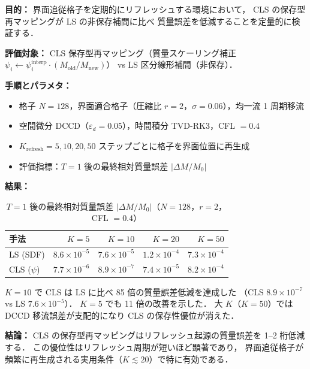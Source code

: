 %

\noindent\textbf{目的：}
界面追従格子を定期的にリフレッシュする環境において，
CLS の保存型再マッピングが LS の非保存補間に比べ
質量誤差を低減することを定量的に検証する．

\noindent\textbf{評価対象：}
CLS 保存型再マッピング（質量スケーリング補正
$\psi_i \leftarrow \psi_i^{\mathrm{interp}} \cdot (M_{\mathrm{old}}/M_{\mathrm{new}})$）
vs LS 区分線形補間（非保存）．

\noindent\textbf{手順とパラメタ：}
\begin{itemize}[noitemsep]
  \item 格子 $N=128$，界面適合格子（圧縮比 $r=2$，$\sigma=0.06$），均一流 1 周期移流
  \item 空間微分 DCCD（$\varepsilon_d = 0.05$），時間積分 TVD-RK3，CFL $=0.4$
  \item $K_{\mathrm{refresh}} = 5, 10, 20, 50$ ステップごとに格子を界面位置に再生成
  \item 評価指標：$T=1$ 後の最終相対質量誤差 $|\Delta M/M_0|$
\end{itemize}

\noindent\textbf{結果：}

\begin{table}[htbp]
  \centering
  \caption{%
    $T=1$ 後の最終相対質量誤差 $|\Delta M/M_0|$（$N=128$，$r=2$，CFL $=0.4$）}
  \label{tab:ls_cls_mass_err}
  \renewcommand{\arraystretch}{1.3}
  \begin{tabular}{lrrrr}
    \toprule
    手法 & $K=5$ & $K=10$ & $K=20$ & $K=50$ \\
    \midrule
    LS (SDF)     & $8.6\times10^{-5}$ & $7.6\times10^{-5}$ & $1.2\times10^{-4}$ & $7.3\times10^{-4}$ \\
    CLS ($\psi$) & $7.7\times10^{-6}$ & $8.9\times10^{-7}$ & $7.4\times10^{-5}$ & $8.2\times10^{-4}$ \\
    \bottomrule
  \end{tabular}
\end{table}

$K=10$ で CLS は LS に比べ 85 倍の質量誤差低減を達成した
（CLS $8.9\times10^{-7}$ vs LS $7.6\times10^{-5}$）．
$K=5$ でも 11 倍の改善を示した．
大 $K$（$K=50$）では DCCD 移流誤差が支配的になり CLS の保存性優位が消えた．

\noindent\textbf{結論：}
CLS の保存型再マッピングはリフレッシュ起源の質量誤差を 1--2 桁低減する．
この優位性はリフレッシュ周期が短いほど顕著であり，
界面追従格子が頻繁に再生成される実用条件（$K \lesssim 20$）で特に有効である．
